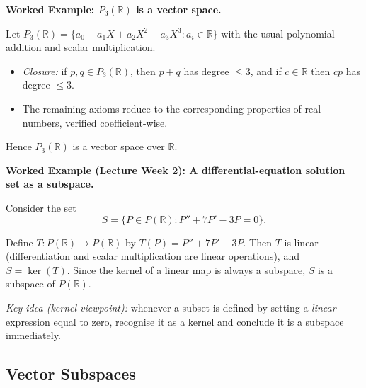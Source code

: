 \begin{examplebox}

\textbf{Worked Example: $P_3(\mathbb{R})$ is a vector space.}

Let $P_3(\mathbb{R})=\{a_0+a_1X+a_2X^2+a_3X^3 : a_i\in\mathbb{R}\}$ with the usual polynomial addition and scalar multiplication.

\begin{itemize}[leftmargin=*]

\item \emph{Closure:} if $p,q\in P_3(\mathbb{R})$, then $p+q$ has degree $\le 3$, and if $c\in\mathbb{R}$ then $cp$ has degree $\le 3$.

\item The remaining axioms reduce to the corresponding properties of real numbers, verified coefficient-wise.

\end{itemize}

Hence $P_3(\mathbb{R})$ is a vector space over $\mathbb{R}$.

\end{examplebox}

\begin{examplebox}
\textbf{Worked Example (Lecture Week 2): A differential-equation solution set as a subspace.}

Consider the set
\[
S = \{P\in P(\mathbb{R}) : P'' + 7P' - 3P = 0\}.
\]

Define $T:P(\mathbb{R})\to P(\mathbb{R})$ by $T(P)=P''+7P'-3P$.  Then $T$ is linear (differentiation and scalar multiplication are linear operations), and $S=\ker(T)$.  Since the kernel of a linear map is always a subspace, $S$ is a subspace of $P(\mathbb{R})$.

\medskip
\emph{Key idea (kernel viewpoint):} whenever a subset is defined by setting a \emph{linear} expression equal to zero, recognise it as a kernel and conclude it is a subspace immediately.
\end{examplebox}


\subsection{Vector Subspaces}


